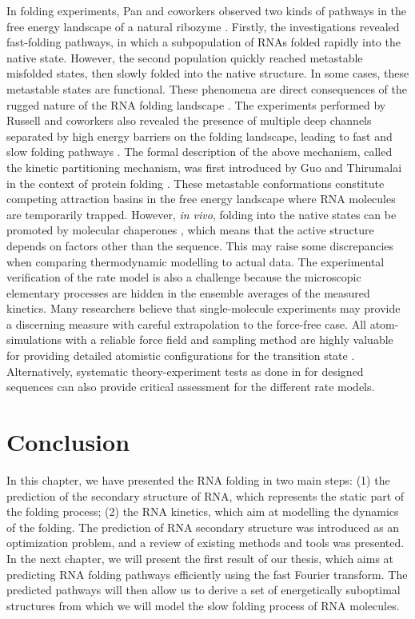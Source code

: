 In folding experiments, Pan and coworkers observed two kinds of pathways in the free energy landscape of a natural ribozyme \cite{pan97_foldin_rna_invol_paral_pathw}. Firstly, the investigations revealed fast-folding pathways, in which a subpopulation of RNAs folded rapidly into the native state. However, the second population quickly reached metastable misfolded states, then slowly folded into the native structure. In some cases, these metastable states are functional. These phenomena are direct consequences of the rugged nature of the RNA folding landscape \cite{solomatin10_multip_nativ_states_reveal_persis}. The experiments performed by Russell and coworkers also revealed the presence of multiple deep channels separated by high energy barriers on the folding landscape, leading to fast and slow folding pathways \cite{russell2002exploring}. The formal description of the above mechanism, called the kinetic partitioning mechanism, was first introduced by Guo and Thirumalai in the context of protein folding \cite{guo95_kinet_protein_foldin}. These metastable conformations constitute competing attraction basins in the free energy landscape where RNA molecules are temporarily trapped. However, \textit{in vivo}, folding into the native states can be promoted by molecular chaperones \cite{chakrabarti2017molecular}, which means that the active structure depends on factors other than the sequence. This may raise some discrepancies when comparing thermodynamic modelling to actual data. The experimental verification of the rate model is also a challenge because the microscopic elementary processes are hidden in the ensemble averages of the measured kinetics.
Many researchers believe that single-molecule experiments may provide a discerning measure with careful extrapolation to the force-free case. All atom-simulations with a reliable force field and sampling method are highly valuable for providing detailed atomistic configurations for the transition state \cite{chen2008rna}. Alternatively, systematic theory-experiment tests as done in \cite{zhang06_explor_compl_foldin_kinet_rna_hairp} for designed sequences can also provide critical assessment for the different rate models.

\section{Conclusion}
In this chapter, we have presented the RNA folding in two main steps: (1) the prediction of the secondary structure of RNA, which represents the static part of the folding process; (2) the RNA kinetics, which aim at modelling the dynamics of the folding. The prediction of RNA secondary structure was introduced as an optimization problem, and a review of existing methods and tools was presented. In the next chapter, we will present the first result of our thesis, which aims at predicting RNA folding pathways efficiently using the fast Fourier transform. The predicted pathways will then allow us to derive a set of energetically suboptimal structures from which we will model the slow folding process of RNA molecules.
